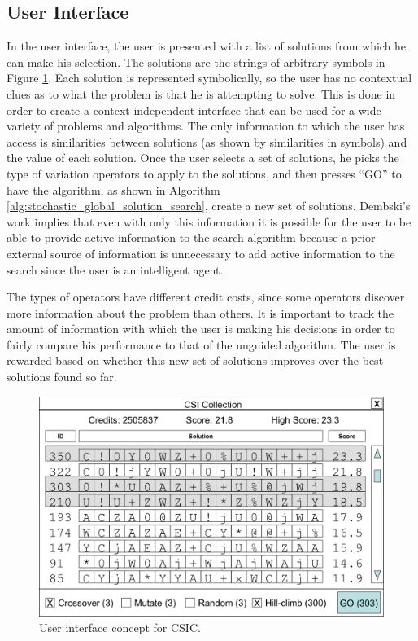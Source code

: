 \subsection{User Interface}

In the user interface, the user is presented with a list of solutions from which he can make his selection.  The solutions are the strings of arbitrary symbols in Figure \ref{fig:CSIC_UI}.  Each solution is represented symbolically, so the user has no contextual clues as to what the problem is that he is attempting to solve.  This is done in order to create a context independent interface that can be used for a wide variety of problems and algorithms. The only information to which the user has access is similarities between solutions (as shown by similarities in symbols) and the value of each solution. Once the user selects a set of solutions, he picks the type of variation operators to apply to the solutions, and then presses ``GO'' to have the algorithm, as shown in Algorithm \ref{alg:stochastic_global_solution_search}, create a new set of solutions.  Dembski's work implies that even with only this information it is possible for the user to be able to provide active information to the search algorithm because a prior external source of information is unnecessary to add active information to the search since the user is an intelligent agent.

The types of operators have different credit costs, since some operators discover more information about the problem than others. It is important to track the amount of information with which the user is making his decisions in order to fairly compare his performance to that of the unguided algorithm.  The user is rewarded based on whether this new set of solutions improves over the best solutions found so far.  

\begin{figure}[!t]
  \centering
  \includegraphics[width=4.5in]{HollowayCSICUI2}
  \caption{User interface concept for CSIC.}
  \label{fig:CSIC_UI}
\end{figure}


